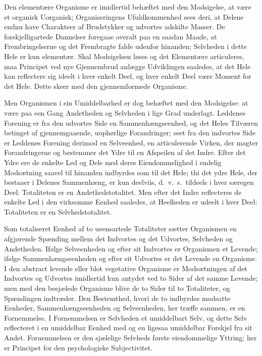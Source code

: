 \documentclass[12pt]{book}
\newcommand{\opage}[1]{\marginnote{\footnotesize\textit{[#1]}}}
\begin{document}
Den elementære Organisme er imidlertid behæftet med den Modsigelse, at være et organisk
Uorganisk; Organiseringens Ufuldkommenhed sees deri, at Delene endnu have Charakteer af
Brudstykker og udvortes adskilte Masser. De forskjelligartede Dannelser foregaae overalt
paa en saadan Maade, at Frembringelserne og det Frembragte falde udenfor hinanden;
Selvheden i dette Hele er kun elementær. Skal Modsigelsen løses og det Elementære
articuleres, maa Principet ved nye Gjennembrud anlægge Udviklingen saaledes, at det Hele
kan reflectere sig ideelt i hver enkelt Deel, og hver enkelt Deel være Moment for det
Hele. Dette skeer med den gjennemformede Organisme.

Men Organismen i sin Umiddelbarhed er dog behæftet med den Modsigelse: at være paa een
Gang Andetheden og Selvheden i lige Grad underlagt. Leddenes Forening er fra den udvortes
Side en Sammenhængseenhed, og det Heles Tilværen betinget af gjennemgaaende, uophørlige
Forandringer; seet fra den indvortes Side er Leddenes Forening derimod en Selveenhed, en
articulerende Virken, der magter Forandringerne og bestemmer det Ydre til en Afspeilen af
det Indre. Efter
\opage{132} det Ydre ere de enkelte Led og Dele med deres Eiendommelighed i endelig Modsætning saavel
til hinanden indbyrdes som til det Hele; thi det ydre Hele, der bestaaer i Delenes
Sammenhæng, er kun deelviis, d.\ v.\ s.\ tildeels i hver særegen Deel: Totaliteten er en
Andethedstotalitet. Men efter det Indre reflecteres de enkelte Led i den virksomme Eenhed
saaledes, at Heelheden er udeelt i hver Deel: Totaliteten er en Selvhedstotalitet.

Som totaliseret Eenhed af to ueensartede Totaliteter sætter Organismen en afgjørende
Spænding mellem det Indvortes og det Udvortes, Selvheden og Andetheden. Ifølge
Selveenheden og efter sit Indvortes er Organismen et Levende; ifølge Sammenhængseenheden
og efter sit Udvortes er det Levende en Organisme. I den abstract levende eller blot
vegetative Organisme er Modsætningen af det Indvortes og Udvortes imidlertid kun antydet
ved to Sider af det samme Levende; men med den besjælede Organisme blive de to Sider til
to Totaliteter, og Spændingen indtræder. Den Bestemthed, hvori de to indbyrdes modsatte
Eenheder, Sammenhængseenheden og Selveenheden, her træffe sammen, er en Fornemmelse. I
Fornemmelsen er Selvheden et umiddelbart Selv, og dette Selv reflecteret i en umiddelbar
Eenhed med og en ligesaa umiddelbar Forskjel fra sit Andet. Fornemmelsen er den sjælelige
Selvheds første eiendommelige Yttring; her er Principet for den psychologiske
Subjectivitet.
\end{document}
